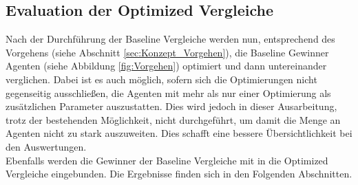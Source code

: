 \subsection{Evaluation der Optimized Vergleiche}
Nach der Durchführung der Baseline Vergleiche werden nun, entsprechend des Vorgehens (siehe Abschnitt \ref{sec:Konzept_Vorgehen}), die Baseline Gewinner Agenten (siehe Abbildung \ref{fig:Vorgehen}) optimiert und dann untereinander verglichen.
Dabei ist es auch möglich, sofern sich die Optimierungen nicht gegenseitig ausschließen, die Agenten mit mehr als nur einer Optimierung als zusätzlichen Parameter auszustatten. Dies wird jedoch in dieser Ausarbeitung, trotz der bestehenden Möglichkeit, nicht durchgeführt, um damit die Menge an Agenten nicht zu stark auszuweiten. Dies schafft eine bessere Übersichtlichkeit bei den Auswertungen.\\
Ebenfalls werden die Gewinner der Baseline Vergleiche mit in die Optimized Vergleiche eingebunden. Die Ergebnisse finden sich in den Folgenden Abschnitten.

